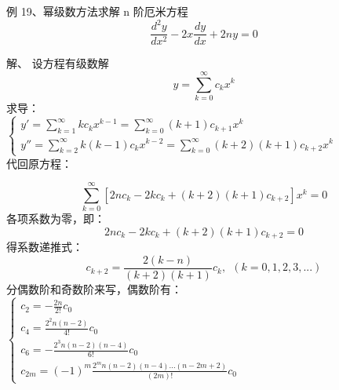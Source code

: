 \begin{frame}
	\begin{exampleblock} {例 19、幂级数方法求解 n 阶厄米方程}
	\begin{equation*}
		\frac{d^2 y}{d x^2} -2x \frac{d y}{d x} +2n y =0 
	\end{equation*}     
	\end{exampleblock}	
	\alert{解、} 	设方程有级数解
	\begin{equation*}
		y=\sum_{k=0}^{\infty} c_k x^k
	\end{equation*}     
	求导：\\
	$\begin{cases}
		y' = \sum_{k=1}^{\infty} k c_k x^{k-1} =\sum_{k=0}^{\infty} (k+1) c_{k+1} x^{k}\\
		y'' = \sum_{k=2}^{\infty} k (k-1) c_k x^{k-2} =  \sum_{k=0}^{\infty} (k+2) (k+1) c_{k+2} x^k
	\end{cases}$ \\
    代回原方程：
 \end{frame}

\begin{frame}
	\begin{equation*}
		\sum_{k=0}^{\infty} [ 2nc_k -2kc_k +(k+2)(k+1) c_{k+2}  ] x^k  =0
	\end{equation*}  
	各项系数为零，即： 
	\begin{equation*}
		2nc_k -2kc_k +(k+2)(k+1) c_{k+2} =0
	\end{equation*}   
	得系数递推式：
	\begin{equation*}
		c_{k+2} = \frac{ 2(k-n)}{(k+2)(k+1) } c_k, ~~  \left( k=0,1,2,3, ...  \right)
	\end{equation*}   
	分偶数阶和奇数阶来写，偶数阶有： \\
	$\displaystyle \begin{cases}
		c_2 =- \frac{2n}{2!} c_0\\
		c_4 = \frac{2^2n(n-2)}{4!} c_0 \\
		c_6 = -\frac{2^3n(n-2)(n-4)}{6!} c_0 \\
		c_{2m} = (-1) ^m \frac{2^mn(n-2)(n-4) ... (n-2m+2)  } {(2m)!} c_0
	\end{cases}$ \\
\end{frame}


